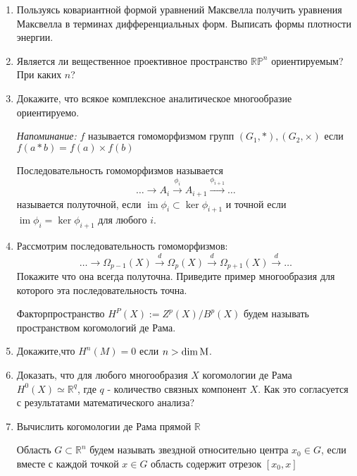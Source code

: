 \documentclass{article}
\theoremstyle{definition}
\DeclareMathOperator{\im}{im}
\begin{document}
\begin{enumerate}
	\item Пользуясь ковариантной формой уравнений Максвелла получить уравнения Максвелла в терминах дифференциальных форм. Выписать формы плотности энергии.
	\item Является ли вещественное проективное пространство $\mathbb{RP}^n$ ориентируемым? При каких $n$?
	\item Докажите, что всякое комплексное аналитическое многообразие ориентируемо.
	
	\vspace{3ex}
\textit{Напоминание:} $f$ называется гомоморфизмом групп $(G_1,*),  (G_2, \times )$ если $f(a*b)= f(a) \times f(b)$

\vspace{2ex}
	Последовательность гомоморфизмов называется
	$$
	\dots \longrightarrow A_i \stackrel{\phi_i} {\longrightarrow} A_{i+1} \stackrel{\phi_{i+1}}{\longrightarrow} \dots
	$$ называется полуточной, если $\im \phi_i \subset \ker \phi_{i+1}$ и точной если $\im \phi_i = \ker \phi_{i+1}$ для любого $i$.

\item Рассмотрим последовательность гомоморфизмов:
 	$$
 \dots \longrightarrow \Omega_{p-1} (X) \stackrel{d} {\longrightarrow} \Omega_p(X)  \stackrel{d}{\longrightarrow} \Omega_{p+1} (X) \stackrel{d}{\longrightarrow} \dots
 $$
 Покажите что она всегда полуточна. Приведите пример многообразия для которого эта последовательность точна.
 
 \vspace{3ex}
 Факторпространство $H^P(X) := Z^p(X) / B^p (X)$
 будем называть пространством когомологий де Рама.
 \item Докажите,что $H^n (M) = 0$ если $n > \dim \text M$.
 \item Доказать, что для любого многообразия $X$ когомологии де Рама $H^0(X)\simeq \mathbb{R}^q$, где $q$ - количество связных компонент $X$. Как это согласуется с результатами математического анализа?
 \item Вычислить когомологии де Рама прямой $\mathbb{R}$
 
 \vspace{3ex}
 Область $G \subset \mathbb{R}^n$ будем называть звездной относительно центра $x_0 \in G$, если вместе с каждой точкой $x \in G$ область содержит отрезок $[x_0, x]$
 

\end{enumerate}
\end{document}
